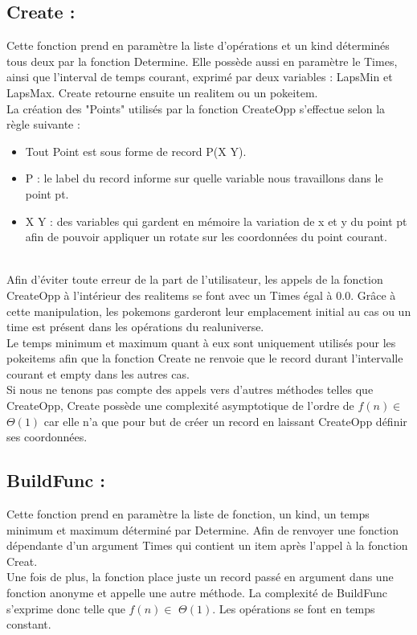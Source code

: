\subsection{Create :}
Cette fonction prend en paramètre la liste d'opérations et un kind déterminés tous deux par la fonction Determine. Elle possède aussi en paramètre le Times, ainsi que l'interval de temps courant, exprimé par deux variables : LapsMin et LapsMax. Create retourne ensuite un realitem ou un pokeitem.
\\La création des "Points" utilisés par la fonction CreateOpp s'effectue selon la règle suivante :
\begin{itemize}

    \item Tout Point est sous forme de record P(X Y).
    \item P : le label du record informe sur quelle variable nous travaillons dans le point pt.
    \item X  Y : des variables qui gardent en mémoire la variation de x et y du point pt afin de pouvoir appliquer un rotate sur les coordonnées du point courant.
\end{itemize}
\\Afin d'éviter toute erreur de la part de l'utilisateur, les appels de la fonction CreateOpp à l'intérieur des realitems se font avec un Times égal à 0.0. Grâce à cette manipulation, les pokemons garderont leur emplacement initial au cas ou un time est présent dans les opérations du realuniverse.
\\Le temps minimum et maximum quant à eux sont uniquement utilisés pour les pokeitems afin que la fonction Create ne renvoie que le record durant l'intervalle courant et empty dans les autres cas.
\\Si nous ne tenons pas compte des appels vers d'autres méthodes telles que CreateOpp, Create possède une complexité asymptotique de l'ordre de $f(n) \in$ $\Theta(1)$  car elle n'a que pour but de créer un record en laissant CreateOpp définir ses coordonnées.
\subsection{BuildFunc :}
Cette fonction prend en paramètre la liste de fonction, un kind, un temps minimum et maximum déterminé par Determine. Afin de renvoyer une fonction dépendante d'un argument Times qui contient un item après l'appel à la fonction Creat.
\\Une fois de plus, la fonction place juste un record passé en argument dans une fonction anonyme et appelle une autre méthode. La complexité de BuildFunc s'exprime donc telle que $f(n) \in$ $\Theta(1)$. Les opérations se font en temps constant.
